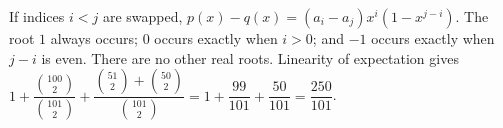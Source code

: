If indices $i<j$ are swapped, $p(x)-q(x)=(a_i-a_j)x^i(1-x^{j-i})$. The root $1$ always occurs; $0$ occurs exactly when $i>0$; and $-1$ occurs exactly when $j-i$ is even. There are no other real roots. Linearity of expectation gives $1+\dfrac{\binom{100}2}{\binom{101}2}+\dfrac{\binom{51}2+\binom{50}2}{\binom{101}2}=1+\dfrac{99}{101}+\dfrac{50}{101}=\boxed{\dfrac{250}{101}}$.
